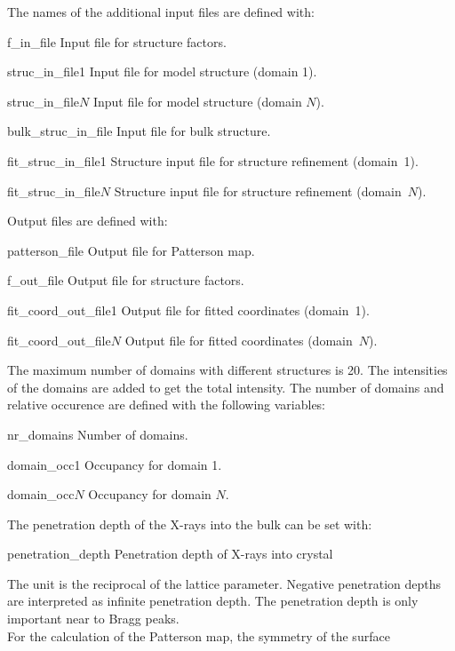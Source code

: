 \documentclass[a4paper]{article}
\begin{document}
 The names of the
additional input files are defined with:
\begin{vardef}

\item[f\_in\_file] Input file for structure factors.
\item[struc\_in\_file1] Input file for model structure (domain 1).
\item[struc\_in\_file$N$] Input file for model structure (domain $N$).
\item[bulk\_struc\_in\_file] Input file for bulk structure.
\item[fit\_struc\_in\_file1] Structure input file for structure
refinement (domain~1). 
\item[fit\_struc\_in\_file$N$] Structure input file for structure
refinement (domain~$N$). 
\end{vardef}
Output files are defined with:
\begin{vardef}
\item[patterson\_file] Output file for Patterson map.  
\item[f\_out\_file] Output file for structure factors.
\item[fit\_coord\_out\_file1] Output file for fitted coordinates
(domain~1).
\item[fit\_coord\_out\_file$N$] Output file for fitted coordinates
(domain~$N$).  
\end{vardef}
The maximum number of domains with different structures is 20. The
intensities of the domains are added to get the total intensity. The
number of domains and relative occurence are defined with the
following variables: 
\begin{vardef}
\item[nr\_domains] Number of domains.
\item[domain\_occ1] Occupancy for domain 1.
\item[domain\_occ$N$] Occupancy for domain $N$.
\end{vardef}
The penetration depth of the X-rays into the bulk can be set with:
\begin{vardef}
\item[penetration\_depth] Penetration depth of X-rays into crystal
\end{vardef}
The unit is the reciprocal of the lattice parameter. Negative
penetration depths are interpreted as infinite penetration depth. The
penetration depth is only important near to Bragg peaks. \\
For the calculation of the Patterson map, the symmetry of the surface
\end{document}
